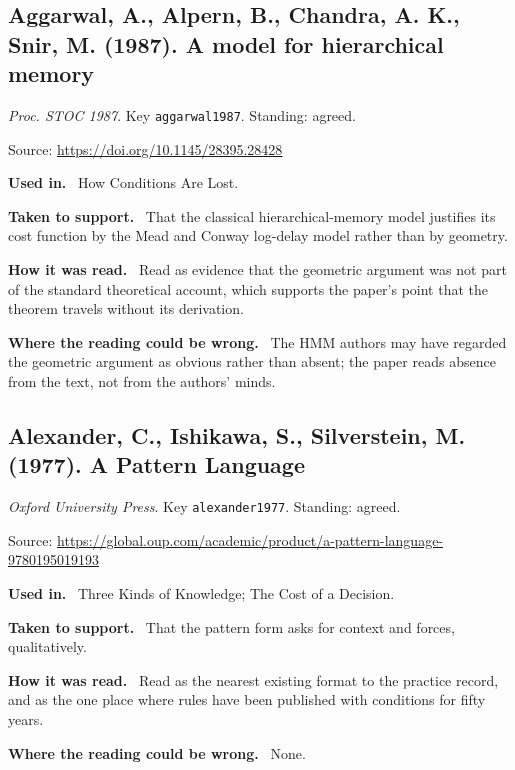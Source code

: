\documentclass[11pt,oneside]{article}
\newcommand{\field}[1]{\par\noindent\textbf{\color{accent}#1.}\ }
\begin{document}
\subsection*{Aggarwal, A., Alpern, B., Chandra, A. K., Snir, M. (1987). A model for hierarchical memory}
\noindent\small\emph{Proc. STOC 1987}. Key \texttt{aggarwal1987}. Standing: agreed.
\par\noindent\small Source: \url{https://doi.org/10.1145/28395.28428}
\normalsize
\field{Used in} How Conditions Are Lost.
\field{Taken to support} That the classical hierarchical-memory model justifies its cost function by the Mead and Conway log-delay model rather than by geometry.
\field{How it was read} Read as evidence that the geometric argument was not part of the standard theoretical account, which supports the paper's point that the theorem travels without its derivation.
\field{Where the reading could be wrong} The HMM authors may have regarded the geometric argument as obvious rather than absent; the paper reads absence from the text, not from the authors' minds.

\hypertarget{src:alexander1977}{}
\subsection*{Alexander, C., Ishikawa, S., Silverstein, M. (1977). A Pattern Language}
\noindent\small\emph{Oxford University Press}. Key \texttt{alexander1977}. Standing: agreed.
\par\noindent\small Source: \url{https://global.oup.com/academic/product/a-pattern-language-9780195019193}
\normalsize
\field{Used in} Three Kinds of Knowledge; The Cost of a Decision.
\field{Taken to support} That the pattern form asks for context and forces, qualitatively.
\field{How it was read} Read as the nearest existing format to the practice record, and as the one place where rules have been published with conditions for fifty years.
\field{Where the reading could be wrong} None.

\hypertarget{src:amdahl1967}{}
\end{document}
